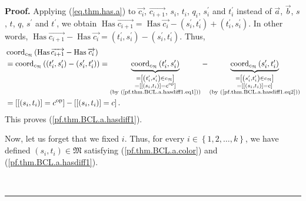 \documentclass
[numbers=enddot,12pt,final,onecolumn,notitlepage,abstracton]{scrartcl}%
\theoremstyle{definition}
\newenvironment{proof}[1][Proof]{\noindent\textbf{#1.} }{\ \rule{0.5em}{0.5em}}
\begin{document}
\begin{proof}
Applying (\ref{eq.thm.has.a}) to $\overrightarrow{c_{i}}$,
$\overrightarrow{c_{i+1}}$, $s_{i}$, $t_{i}$, $q_{i}$, $s_{i}^{\prime}$ and
$t_{i}^{\prime}$ instead of $\overrightarrow{a}$, $\overrightarrow{b}$, $s$,
$t$, $q$, $s^{\prime}$ and $t^{\prime}$, we obtain $\operatorname*{Has}%
\overrightarrow{c_{i+1}}=\operatorname*{Has}\overrightarrow{c_{i}}-\left(
s_{i}^{\prime},t_{i}^{\prime}\right)  +\left(  t_{i}^{\prime},s_{i}^{\prime
}\right)  $. In other words, $\operatorname*{Has}\overrightarrow{c_{i+1}%
}-\operatorname*{Has}\overrightarrow{c_{i}}=\left(  t_{i}^{\prime}%
,s_{i}^{\prime}\right)  -\left(  s_{i}^{\prime},t_{i}^{\prime}\right)  $.
Thus,%
\begin{align*}
&  \operatorname*{coord}\nolimits_{c_{\mathfrak{N}}}\left(
\operatorname*{Has}\overrightarrow{c_{i+1}}-\operatorname*{Has}%
\overrightarrow{c_{i}}\right) \\
&  =\operatorname*{coord}\nolimits_{c_{\mathfrak{N}}}\left(  \left(
t_{i}^{\prime},s_{i}^{\prime}\right)  -\left(  s_{i}^{\prime},t_{i}^{\prime
}\right)  \right)  =\underbrace{\operatorname*{coord}%
\nolimits_{c_{\mathfrak{N}}}\left(  t_{i}^{\prime},s_{i}^{\prime}\right)
}_{\substack{=\left[  \left(  t_{i}^{\prime},s_{i}^{\prime}\right)  \in
c_{\mathfrak{N}}\right]  \\=\left[  \left[  \left(  s_{i},t_{i}\right)
\right]  =c^{\operatorname*{op}}\right]  \\\text{(by
(\ref{pf.thm.BCL.a.hasdiff1.eq1}))}}}-\underbrace{\operatorname*{coord}%
\nolimits_{c_{\mathfrak{N}}}\left(  s_{i}^{\prime},t_{i}^{\prime}\right)
}_{\substack{=\left[  \left(  s_{i}^{\prime},t_{i}^{\prime}\right)  \in
c_{\mathfrak{N}}\right]  \\=\left[  \left[  \left(  s_{i},t_{i}\right)
\right]  =c\right]  \\\text{(by (\ref{pf.thm.BCL.a.hasdiff1.eq2}))}}}\\
&  =\left[  \left[  \left(  s_{i},t_{i}\right)  \right]
=c^{\operatorname*{op}}\right]  -\left[  \left[  \left(  s_{i},t_{i}\right)
\right]  =c\right]  .
\end{align*}
This proves (\ref{pf.thm.BCL.a.hasdiff1}).

Now, let us forget that we fixed $i$. Thus, for every $i\in\left\{
1,2,\ldots,k\right\}  $, we have defined $\left(  s_{i},t_{i}\right)
\in\mathfrak{M}$ satisfying (\ref{pf.thm.BCL.a.color}) and
(\ref{pf.thm.BCL.a.hasdiff1}).


\end{proof}
\end{document}
